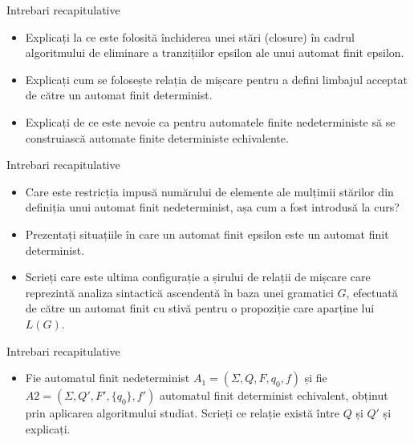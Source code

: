 \documentclass[pdf]{beamer}
\begin{document}
\begin{frame}{Intrebari recapitulative}
\begin{itemize}

\item
Explicați la ce este folosită închiderea unei stări (closure) în cadrul algoritmului de eliminare a tranzițiilor epsilon ale unui automat finit epsilon.
\newline

\item
Explicați cum se folosește relația de mișcare pentru a defini limbajul acceptat de către un automat finit determinist.
\newline

\item
Explicați de ce este nevoie ca pentru automatele finite nedeterministe să se construiască automate finite deterministe echivalente.
\newline

\end{itemize}
\end{frame}



\begin{frame}{Intrebari recapitulative}
\begin{itemize}

\item
Care este restricția impusă numărului de elemente ale mulțimii stărilor din definiția unui automat finit nedeterminist, așa cum a fost introdusă la curs?
\newline

\item
Prezentați situațiile în care un automat finit epsilon este un automat finit determinist.
\newline

\item
Scrieți care este ultima configurație a șirului de relații de mișcare care reprezintă analiza sintactică ascendentă în baza unei gramatici $G$, efectuată de către un automat finit cu stivă pentru o propoziție care aparține lui $L(G)$.

\end{itemize}
\end{frame}



\begin{frame}{Intrebari recapitulative}
\begin{itemize}

\item
Fie automatul finit nedeterminist $A_1=(\Sigma, Q, F, q_0, f)$ și fie $A2=(\Sigma, Q', F', \{q_0\}, f')$ automatul finit determinist echivalent, obținut prin aplicarea algoritmului studiat. Scrieți ce relație există între $Q$ și $Q'$ și explicați.

\end{itemize}
\end{frame}
\end{document}
